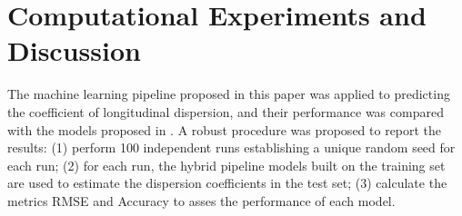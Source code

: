 \documentclass[a4paper,12pt, english]{article}
\begin{document}



\section{\label{sec:results} Computational Experiments and Discussion}

The machine learning pipeline proposed in this paper was applied to predicting the coefficient of longitudinal dispersion, and their performance was compared with the models proposed in \cite{tayfur2005predicting}. 
% 
A robust procedure was proposed to report the results: (1) perform 100 independent runs establishing a unique random seed for each run; (2) for each run, the hybrid pipeline models built on the training set are used to estimate the dispersion coefficients in the test set;  (3) calculate the metrics RMSE and Accuracy to asses the performance of each model.
\end{document}
